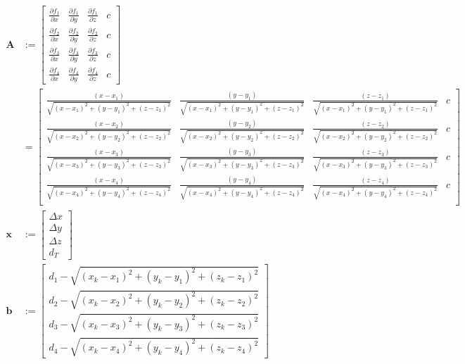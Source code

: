 \documentclass[a4paper,twoside,12pt]{memoir} %
\begin{document}
\begin{align}
\mathbf{A} & := \begin{bmatrix}
\frac{\partial f_1}{\partial x} &
\frac{\partial f_1}{\partial y} &
\frac{\partial f_1}{\partial z} &
c \\
\frac{\partial f_2}{\partial x} &
\frac{\partial f_2}{\partial y} &
\frac{\partial f_2}{\partial z} &
c \\
\frac{\partial f_3}{\partial x} &
\frac{\partial f_3}{\partial y} &
\frac{\partial f_3}{\partial z} &
c \\
\frac{\partial f_4}{\partial x} &
\frac{\partial f_4}{\partial y} &
\frac{\partial f_4}{\partial z} &
c
\end{bmatrix} \\
& =  \begin{bmatrix}
\frac{(x-x_1)}{\sqrt{(x-x_1)^{2}+(y-y_1)^{2}+(z-z_1)^{2}}} & \frac{(y-y_1)}{\sqrt{(x-x_1)^{2}+(y-y_1)^{2}+(z-z_1)^{2}}} & \frac{(z-z_1)}{\sqrt{(x-x_1)^{2}+(y-y_1)^{2}+(z-z_1)^{2}}} & c \\
\frac{(x-x_2)}{\sqrt{(x-x_2)^{2}+(y-y_2)^{2}+(z-z_2)^{2}}} & \frac{(y-y_2)}{\sqrt{(x-x_2)^{2}+(y-y_2)^{2}+(z-z_2)^{2}}} & \frac{(z-z_2)}{\sqrt{(x-x_2)^{2}+(y-y_2)^{2}+(z-z_2)^{2}}} & c \\
\frac{(x-x_3)}{\sqrt{(x-x_3)^{2}+(y-y_3)^{2}+(z-z_3)^{2}}} & \frac{(y-y_3)}{\sqrt{(x-x_3)^{2}+(y-y_3)^{2}+(z-z_3)^{2}}} & \frac{(z-z_3)}{\sqrt{(x-x_3)^{2}+(y-y_3)^{2}+(z-z_3)^{2}}} & c \\
\frac{(x-x_4)}{\sqrt{(x-x_4)^{2}+(y-y_4)^{2}+(z-z_4)^{2}}} & \frac{(y-y_4)}{\sqrt{(x-x_4)^{2}+(y-y_4)^{2}+(z-z_4)^{2}}} & \frac{(z-z_4)}{\sqrt{(x-x_4)^{2}+(y-y_4)^{2}+(z-z_4)^{2}}} & c \\
\end{bmatrix}\\
\mathbf{x} & :=  \begin{bmatrix}
\Delta x \\
\Delta y \\
\Delta z \\
 d_T
\end{bmatrix}\\
\mathbf{b} & := \begin{bmatrix}
d_1 - \sqrt{(x_k-x_1)^{2}+(y_k-y_1)^{2}+(z_k-z_1)^{2}} \\
d_2 - \sqrt{(x_k-x_2)^{2}+(y_k-y_2)^{2}+(z_k-z_2)^{2}} \\
d_3 - \sqrt{(x_k-x_3)^{2}+(y_k-y_3)^{2}+(z_k-z_3)^{2}} \\
d_4 - \sqrt{(x_k-x_4)^{2}+(y_k-y_4)^{2}+(z_k-z_4)^{2}}
\end{bmatrix}
\end{align}
\end{document}
